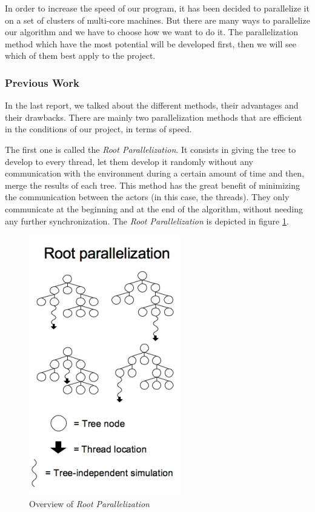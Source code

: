 In order to increase the speed of our program, it has been decided to parallelize it on a set of clusters of multi-core machines. But there are many ways to parallelize our algorithm and we have to choose how we want to do it. The parallelization method which have the most potential will be developed first, then we will see which of them best apply to the project.
\subsubsection{Previous Work}
In the last report, we talked about the different methods, their advantages and their drawbacks. There are mainly two parallelization methods that are efficient in the conditions of our project, in terms of speed.

The first one is called the \textit{Root Parallelization}. It consists in giving the tree to develop to every thread, let them develop it randomly without any communication with the environment
during a certain amount of time and then, merge the results of each tree.
This method has the great benefit of minimizing the communication between the actors (in this case, the threads).
They only communicate at the beginning and at the end of the algorithm, without needing any further synchronization. The \textit{Root Parallelization} is depicted in figure \ref{fig:root}.

\begin{figure}[!ht] 
\centerline{\includegraphics[scale=0.5]{3Methods/3.1Parallelization_Method/root.png}}
   \caption{Overview of \textit{Root Parallelization} \cite{parallel_comp}}
\label{fig:root}
\end{figure}
\clearpage

